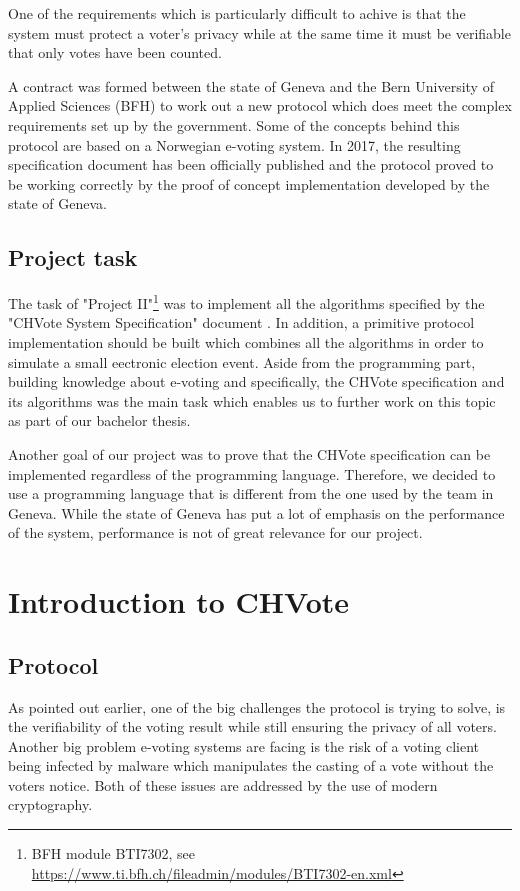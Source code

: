 \documentclass[a4paper,12pt]{report}
\begin{document}
One of the requirements which is particularly difficult to achive is that the system must protect a voter's privacy while at the same time it must be verifiable that only votes have been counted.

A contract was formed between the state of Geneva and the Bern University of Applied Sciences (BFH) to work out a new protocol which does meet the complex requirements set up by the government. Some of the concepts behind this protocol are based on a Norwegian e-voting system. In 2017, the resulting specification document has been officially published and the protocol proved to be working correctly by the proof of concept implementation developed by the state of Geneva.

\section{Project task}
The task of "Project II"\footnote{BFH module BTI7302, see \url{https://www.ti.bfh.ch/fileadmin/modules/BTI7302-en.xml}} was to implement all the algorithms specified by the "CHVote System Specification" document \cite{chvote}. In addition, a primitive protocol implementation should be built which combines all the algorithms in order to simulate a small eectronic election event. Aside from the programming part, building knowledge about e-voting and specifically, the CHVote specification and its algorithms was the main task which enables us to further work on this topic as part of our bachelor thesis.

Another goal of our project was to prove that the CHVote specification can be implemented regardless of the programming language. Therefore, we decided to use a programming language that is different from the one used by the team in Geneva. While the state of Geneva has put a lot of emphasis on the performance of the system, performance is not of great relevance for our project.

\chapter{Introduction to CHVote}
\section{Protocol}
As pointed out earlier, one of the big challenges the protocol is trying to solve, is the verifiability of the voting result while still ensuring the privacy of all voters. Another big problem e-voting systems are facing is the risk of a voting client being infected by malware which manipulates the casting of a vote without the voters notice. Both of these issues are addressed by the use of modern cryptography.
\end{document}
